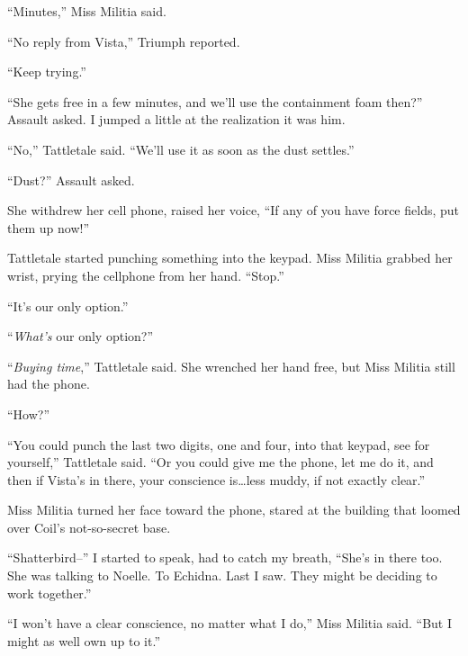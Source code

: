 ``Minutes,'' Miss Militia said.



``No reply from Vista,'' Triumph reported.



``Keep trying.''



``She gets free in a few minutes, and we'll use the containment foam then?'' Assault asked.  I jumped a little at the realization it was him.



``No,'' Tattletale said.  ``We'll use it as soon as the dust settles.''



``Dust?''  Assault asked.



She withdrew her cell phone, raised her voice, ``If any of you have force fields, put them up now!''



Tattletale started punching something into the keypad.  Miss Militia grabbed her wrist, prying the cellphone from her hand.  ``Stop.''



``It's our only option.''



``\emph{What's} our only option?''



``\emph{Buying time},'' Tattletale said.  She wrenched her hand free, but Miss Militia still had the phone.



``How?''



``You could punch the last two digits, one and four, into that keypad, see for yourself,'' Tattletale said.  ``Or you could give me the phone, let me do it, and then if Vista's in there, your conscience is\ldots less muddy, if not exactly clear.''



Miss Militia turned her face toward the phone, stared at the building that loomed over Coil's not-so-secret base.



``Shatterbird--'' I started to speak, had to catch my breath, ``She's in there too.  She was talking to Noelle.  To Echidna.  Last I saw.  They might be deciding to work together.''



``I won't have a clear conscience, no matter what I do,'' Miss Militia said.  ``But I might as well own up to it.''



